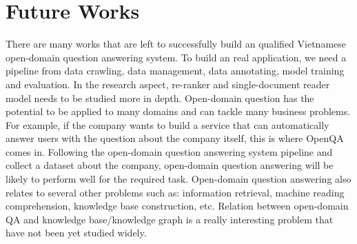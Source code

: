 \documentclass[12pt, sort&compress]{report}
\begin{document}
\section{Future Works}
\label{sec:6.2}
There are many works that are left to successfully build an qualified Vietnamese open-domain question answering system. To build an real application, we need a pipeline from data crawling, data management, data annotating, model training and evaluation. In the research aspect, re-ranker and single-document reader model needs to be studied more in depth. Open-domain question has the potential to be applied to many domains and can tackle many business problems. For example, if the company wants to build a service that can automatically answer users with the question about the company itself, this is where OpenQA comes in. Following the open-domain question answering system pipeline and collect a dataset about the company, open-domain question answering will be likely to perform well for the required task. Open-domain question answering also relates to several other problems such as: information retrieval, machine reading comprehension, knowledge base construction, etc. Relation between open-domain QA and knowledge base/knowledge graph is a really interesting problem that have not been yet studied widely.
\newpage


\end{document}
